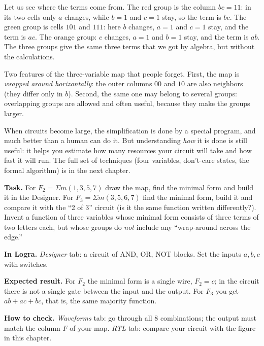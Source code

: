 Let us see where the terms come from. The red group is the column $bc=11$: in
its two cells only $a$ changes, while $b=1$ and $c=1$ stay, so the term is
$bc$. The green group is cells $101$ and $111$: here $b$ changes, $a=1$ and
$c=1$ stay, and the term is $ac$. The orange group: $c$ changes, $a=1$ and
$b=1$ stay, and the term is $ab$. The three groups give the same three terms
that we got by algebra, but without the calculations.

Two features of the three-variable map that people forget. First, the map is
\emph{wrapped around horizontally}: the outer columns $00$ and $10$ are also
neighbors (they differ only in $b$). Second, the same one may belong to
several groups: overlapping groups are allowed and often useful, because they
make the groups larger.

\begin{infobox}
When circuits become large, the simplification is done by a special program,
and much better than a human can do it. But understanding \emph{how} it is
done is still useful: it helps you estimate how many resources your circuit
will take and how fast it will run. The full set of techniques (four
variables, don't-care states, the formal algorithm) is in the next chapter.
\end{infobox}

\begin{diybox}
\textbf{Task.}  For $F_2=\Sigma m(1,3,5,7)$ draw the map, find the
minimal form and build it in the Designer.  For
$F_3=\Sigma m(3,5,6,7)$ find the minimal form, build it and compare it with
the ``2 of 3'' circuit (is it the same function written differently?).
 Invent a function of three variables whose minimal form consists of
three terms of two letters each, but whose groups do \emph{not} include any
``wrap-around across the edge.''

\textbf{In Logra.} \emph{Designer} tab: a circuit of AND, OR, NOT blocks. Set
the inputs $a,b,c$ with switches.

\textbf{Expected result.} For $F_2$ the minimal form is a single wire,
$F_2=c$; in the circuit there is not a single gate between the input and the
output. For $F_3$ you get $ab+ac+bc$, that is, the same majority function.

\textbf{How to check.} \emph{Waveforms} tab: go through all 8 combinations;
the output must match the column $F$ of your map. \emph{RTL} tab: compare your
circuit with the figure in this chapter.
\end{diybox}

